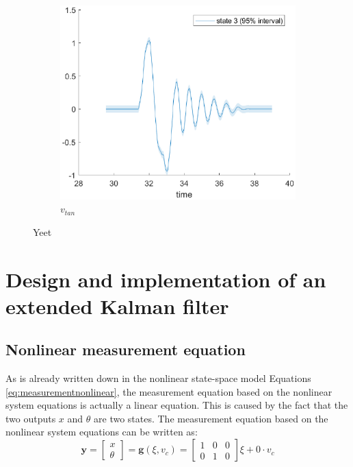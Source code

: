 \documentclass[a4paper,kul]{kulakarticle} %
\begin{document}
\begin{figure}[htp!]
\begin{subfigure}[b]{0.48\textwidth}
		\centering 
		\includegraphics[width=\textwidth]{state3.eps}
		\caption{$v_{tan}$}
	\end{subfigure}
	\caption{Yeet} 
	\label{fig:yeet}
\end{figure}




	
\section{Design and implementation of an extended Kalman filter}
\subsection{Nonlinear measurement equation}
As is already written down in the nonlinear state-space model Equations \ref{eq:measurementnonlinear}, the measurement equation based on the nonlinear system equations is actually a linear equation. This is caused by the fact that the two outputs $x$ and $\theta$ are two states. The measurement equation based on the nonlinear system equations can be written as:
\begin{equation}
	\mathbf{y} = \begin{bmatrix}
	x\\\theta
	\end{bmatrix} = \mathbf{g}(\xi,v_c) = \begin{bmatrix}
	1&0&0\\0&1&0
	\end{bmatrix}\xi + 0 \cdot v_c
	\label{eq:g}
\end{equation}
\end{document}
